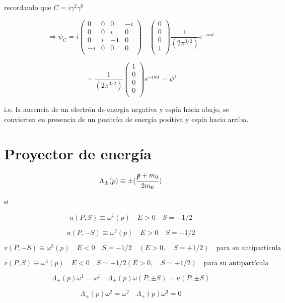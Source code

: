\documentclass{report}
\begin{document}
recordando que $C = i \gamma^2 \gamma^0 $

\[\Rightarrow \psi_{C} = i \left ( \begin{array}{cccc}
 0 & 0 & 0 & -i  \\
 0 & 0 & i & 0 \\
 0 & i & -1 & 0 \\
 -i & 0 & 0 & 0 \\
 \end{array} \right) \quad  \left ( \begin{array}{cccc}
 0   \\
 0   \\
 0   \\
 1   \\
 \end{array} \right) \frac{1}{(2\pi^{3/2})} e^{-imt}\]

\[= \frac{1}{(2\pi^{3/2})} \left ( \begin{array}{cccc}
 1   \\
 0   \\
 0   \\
 0   \\
 \end{array} \right) e^{-imt} = \psi^1\]

i.e. la ausencia de un electrón de energía negativa y espín hacia abajo, se convierten en presencia de un positrón de energía positiva y espín hacia arriba.

\section{Proyector de energ\'ia}

\[\Lambda_{\pm}(p) \equiv \pm (\frac{\slashed{p}+m_0 }{2m_0 }) \]

si

\[u(P,S) \equiv \omega^{1}(p) \quad E>0 \quad S= + 1/2\]

\[u(P,-S) \equiv \omega^{2}(p) \quad E>0 \quad S= - 1/2\]

\[v(P,-S) \equiv \omega^{3}(p) \quad E<0 \quad S= - 1/2 \quad (E>0 , \quad S= +1/2) \quad \text{para su antipartícula}\]

\[v(P,S) \equiv \omega^{4}(p) \quad E<0 \quad S= + 1/2 (E>0 , \quad S= +1/2) \quad \text{para su antipartícula}\]

\[\Lambda_{+}(p) \omega^{1} = \omega^{1} \quad \Lambda_{+}(p) \omega(P, \pm S) = u(P, \pm S)\]

\[\Lambda_{+}(p) \omega^{2} = \omega^{2} \quad \Lambda_{+}(p) \omega^{3} = 0\]
\end{document}

